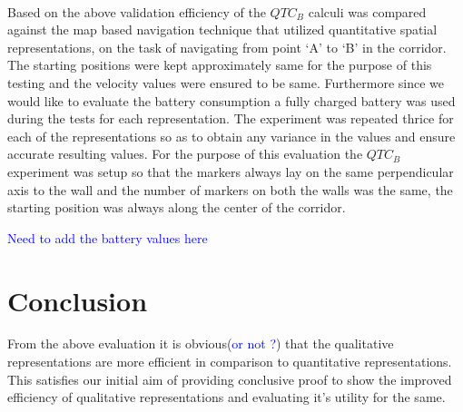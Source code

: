 \paragraph{}Based on the above validation efficiency of the $QTC_B$ calculi was compared against the map based navigation technique that utilized quantitative spatial representations, on the task of navigating from point `A' to `B' in the corridor. The starting positions were kept approximately same for the purpose of this testing and the velocity values were ensured to be same. Furthermore since we would like to evaluate the battery consumption a fully charged battery was used during the tests for each representation. The experiment was repeated thrice for each of the representations so as to obtain any variance in the values and ensure accurate resulting values. For the purpose of this evaluation the $QTC_B$ experiment was setup so that the markers always lay on the same perpendicular axis to the wall and the number of markers on both the walls was the same, the starting position was always along the center of the corridor.



\textcolor{blue}{Need to add the battery values here}

\section{Conclusion}
From the above evaluation it is obvious(\textcolor{blue}{or not ?}) that the qualitative representations are more efficient in comparison to quantitative representations. This satisfies our initial aim of providing conclusive proof to show the improved efficiency of qualitative representations and evaluating it's utility for the same.
